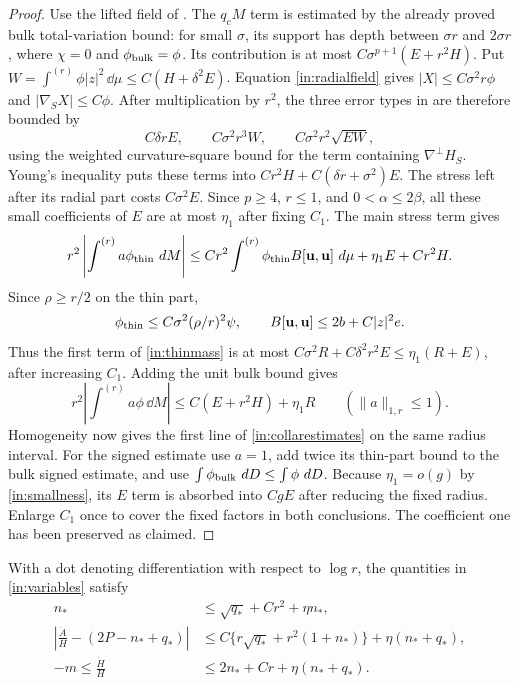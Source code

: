 \begin{proof}
Use the lifted field of .  The $q_cM$ term
is estimated by the already proved bulk total-variation bound: for small
$\sigma$, its support has depth between $\sigma r$ and $2\sigma r$, where
$\chi=0$ and $\phi_{\rm bulk}=\phi$.  Its contribution is at most
$C\sigma^{p+1}(E+r^2H)$.  Put
$W=\int^{(r)}\phi|z|^2\,\dd\mu\leq C(H+\delta^2E)$.
Equation \eqref{in:radialfield} gives $|X|\leq C\sigma^2r\phi$ and
$|\nabla_SX|\leq C\phi$.  After multiplication by $r^2$, the three
error types in  are therefore bounded by
\[
 C\delta rE,\qquad C\sigma^2r^3W,\qquad
 C\sigma^2r^2\sqrt{EW},
\]
using the weighted curvature-square bound for the term containing
$\nabla^\perp H_S$.  Young's inequality puts these terms into
$Cr^2H+C(\delta r+\sigma^2)E$.  The stress left after its radial part
costs $C\sigma^2E$.  Since $p\geq4$, $r\leq1$, and
$0<\alpha\leq2\beta$, all these small coefficients of $E$ are at most
$\eta_1$ after fixing $C_1$.  The main stress term gives
\begin{equation}\label{in:thinmass}
 r^2\left|\int^{(r)}a\phi_{\rm thin}\,\mathop{}\!d M\right|
 \leq Cr^2\int^{(r)}\phi_{\rm thin}B[\mathbf u,\mathbf u]\,\mathop{}\!d\mu
                  +\eta_1 E+Cr^2H.
\end{equation}
Since $\rho\geq r/2$ on the thin part,
\[
 \phi_{\rm thin}\leq C\sigma^2(\rho/r)^2\psi,
 \qquad B[\mathbf u,\mathbf u]\leq2b+C|z|^2e.
\]
Thus the first term of \eqref{in:thinmass} is at most
$C\sigma^2R+C\delta^2r^2E\leq\eta_1(R+E)$, after increasing $C_1$.
Adding the unit bulk bound gives
\[
 r^2\left|\int^{(r)}a\phi\,\dd M\right|
 \leq C(E+r^2H)+\eta_1R\qquad(\|a\|_{1,r}\leq1).
\]
Homogeneity now gives the first line of \eqref{in:collarestimates} on
the same radius interval.  For the signed estimate use $a=1$, add twice
its thin-part bound to the bulk signed estimate, and use
$\int\phi_{\rm bulk}\,\mathop{}\!d D\leq\int\phi\,\mathop{}\!d D$.
Because $\eta_1=o(g)$ by \eqref{in:smallness}, its $E$ term is absorbed
into $CgE$ after reducing the fixed radius.  Enlarge $C_1$ once to cover
the fixed factors in both conclusions.  The coefficient one has
been preserved as claimed.
\end{proof}

\begin{lemma}\label{in:frequency}
With a dot denoting differentiation with respect to $\log r$, the
quantities in \eqref{in:variables} satisfy
\begin{align}
 n_*&\leq\sqrt{q_*}+Cr^2+\eta n_*,\label{in:normalfrequency}\\
 \left|\frac{\dot A}{H}-(2P-n_*+q_*)\right|
  &\leq C\{r\sqrt{q_*}+r^2(1+n_*)\}+\eta(n_*+q_*),
                         \label{in:horizontalfrequency}\\
 -m\leq\frac{\dot H}{H}
  &\leq2n_*+Cr+\eta(n_*+q_*).\label{in:heightfrequency}
\end{align}
\end{lemma}

